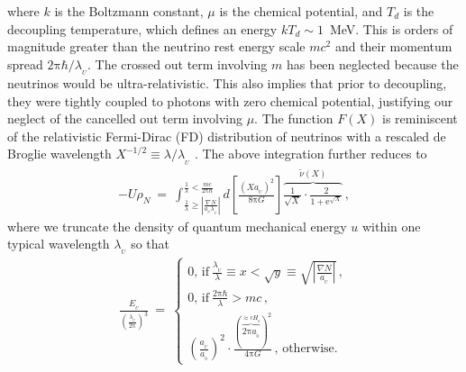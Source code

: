 \documentclass[fleqn,usenatbib,useAMS,onecolumn]{mnras} %
\begin{document}
where $k$ is the Boltzmann constant, $\mu$ is the chemical potential, and $T_d$ is the decoupling temperature, which defines an energy $kT_d \sim 1$~MeV. This is orders of magnitude greater than the neutrino rest energy scale $mc^2$ and their momentum spread $2\mathrm{\pi}\hbar/\lambda_{_U}$. The crossed out term involving $m$ has been neglected because the neutrinos would be ultra-relativistic. This also implies that prior to decoupling, they were tightly coupled to photons with zero chemical potential, justifying our neglect of the cancelled out term involving $\mu$. The function $F\left(X \right)$ is reminiscent of the relativistic Fermi-Dirac (FD) distribution of neutrinos with a rescaled de Broglie wavelength $X^{-1/2} \equiv \lambda/\lambda_{_U}$ \citep[c.f.][]{Zhao_2008_neutrinos}. The above integration further reduces to
\begin{eqnarray}
    -U \rho_N ~=~ \int^{\frac{1}{\lambda} < \frac{mc}{2\mathrm{\pi}\hbar}}_{\frac{1}{\lambda} \ge \left|\frac{\nabla N }{a_{_U}\lambda_{_U}}\right|} d\left[ \frac{\left(X a_{_U}\right)^2}{8\mathrm{\pi} G} \right]  \overbrace{\frac{1}{\sqrt{X}} \cdot \frac{2}{1 + \mathrm{e}^{\sqrt{X}}}}^{\widetilde{\nu} \left( X \right)} \, ,
    \label{covnu}
\end{eqnarray}
where we truncate the density of quantum mechanical energy $u$ within one typical wavelength $\lambda_{_U}$ so that \citep[c.f.][]{Zhao_2008_neutrinos}
\begin{eqnarray}
	\frac{E_{_U}}{\left( \frac{\lambda_{_U}}{2\mathrm{\pi}} \right)^3} ~=~ \left\{
	\begin{array}{l}
		0 \text{, if}~\frac{\lambda_{_U}}{\lambda} \equiv x < \sqrt{y} \equiv 
 \sqrt{\left|\frac{\nabla N }{a_{_U}}\right|}\, , \\ 
		0 \text{, if}~\frac{2\mathrm{\pi}\hbar}{\lambda} > m c \, , \\
		\left( \frac{a_{_U}}{a_{_0}} \right)^2 \cdot \frac{\left(\overbrace{2 \mathrm{\pi} a_{_0}}^{\approx c H_{_0}}\right)^2}{4\mathrm{\pi} G} \, \text{, otherwise.}
	\end{array}
\right.
\end{eqnarray}
\end{document}
